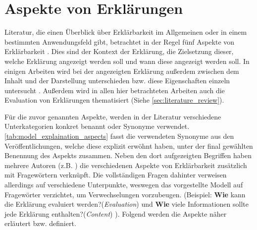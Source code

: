 \section{Aspekte von Erklärungen}
\label{sec:model_explanation_aspects}

Literatur, die einen Überblick über Erklärbarkeit im Allgemeinen oder in einem bestimmten Anwendungsfeld gibt, betrachtet in der Regel fünf Aspekte von Erklärbarkeit \cite{rosenfeld_explainability_2019, nunes_systematic_2017,chazette_knowledge_nodate}. Dies sind der Kontext der Erklärung, die Zielsetzung dieser, welche Erklärung angezeigt werden soll und wann diese angezeigt werden soll. In einigen Arbeiten wird bei der angezeigten Erklärung außerdem zwischen dem Inhalt und der Darstellung unterschieden bzw. diese Eigenschaften einzeln untersucht \cite{nunes_systematic_2017,abdulrahman_belief-based_2019}. Außerdem wird in allen hier betrachteten Arbeiten auch die Evaluation von Erklärungen thematisiert (Siehe \autoref{sec:literature_review}).

Für die zuvor genannten Aspekte, werden in der Literatur verschiedene Unterkategorien konkret benannt oder Synonyme verwendet. \autoref{tab:model_explaination_aspects} fasst die verwendeten Synonyme aus den Veröffentlichungen, welche diese explizit erwöhnt haben, unter der final gewählten Benennung des Aspekts zusammen. Neben den dort aufgezeigten Begriffen haben mehrere Autoren (z.B. \cite{rosenfeld_explainability_2019, chazette2020explainability}) die verschiedenen Aspekte von Erklärbarkeit zusätzlich mit Fragewörtern verknüpft. Die vollständigen Fragen dahinter verweisen allerdings auf verschiedene Unterpunkte, weswegen das vorgestellte Modell auf Fragewörter verzichtet, um Verwechselungen vorzubeugen. (Beispiel: \glqq \textbf{Wie} kann die Erklärung evaluiert werden?\grqq (\textit{Evaluation})\cite[vgl.][]{rosenfeld_explainability_2019} und \glqq \textbf{Wie} viele Informationen sollte jede Erklärung enthalten?\grqq (\textit{Content}) \cite[vgl.][]{kouki_user_2017}). Folgend werden die Aspekte näher erläutert bzw. definiert.


